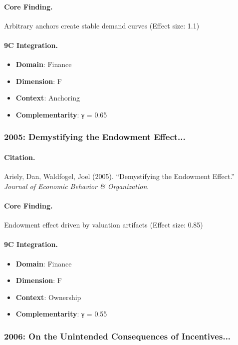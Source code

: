 \paragraph{Core Finding.}
Arbitrary anchors create stable demand curves (Effect size: 1.1)

\paragraph{9C Integration.}
\begin{itemize}[nosep]
  \item \textbf{Domain}: Finance
  \item \textbf{Dimension}: F
  \item \textbf{Context}: Anchoring
  \item \textbf{Complementarity}: γ = 0.65
\end{itemize}

\subsubsection{2005: Demystifying the Endowment Effect...}

\paragraph{Citation.}
Ariely, Dan, Waldfogel, Joel (2005). ``Demystifying the Endowment Effect.''
\textit{Journal of Economic Behavior & Organization}.

\paragraph{Core Finding.}
Endowment effect driven by valuation artifacts (Effect size: 0.85)

\paragraph{9C Integration.}
\begin{itemize}[nosep]
  \item \textbf{Domain}: Finance
  \item \textbf{Dimension}: F
  \item \textbf{Context}: Ownership
  \item \textbf{Complementarity}: γ = 0.55
\end{itemize}

\subsubsection{2006: On the Unintended Consequences of Incentives...}

